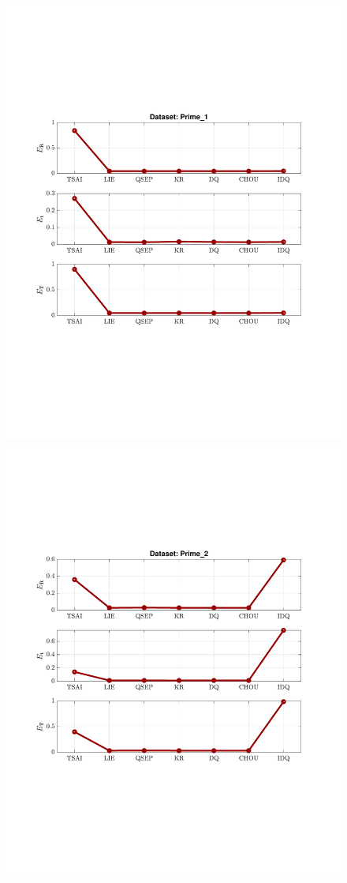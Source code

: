 \begin{figure}
\centering
\includegraphics[scale=0.7]{./hand_eye_figures/real/Result_Prime_1}
\includegraphics[scale=0.7]{./hand_eye_figures/real/Result_Prime_2}

\end{figure}

